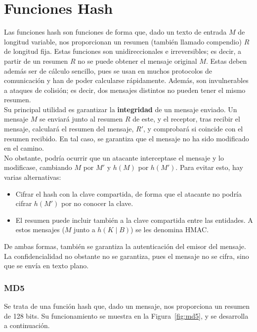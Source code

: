\section{Funciones Hash}

Las funciones hash son funciones de forma que, dado un texto de entrada $M$ de longitud variable, nos proporcionan un resumen (también llamado compendio) $R$ de longitud fija. Estas funciones son unidireccionales e irreversibles; es decir, a partir de un resumen $R$ no se puede obtener el mensaje original $M$. Estas deben además ser de cálculo sencillo, pues se usan en muchos protocolos de comunicación y han de poder calcularse rápidamente. Además, son invulnerables a ataques de colisión; es decir, dos mensajes distintos no pueden tener el mismo resumen.\\



Su principal utilidad es garantizar la \textbf{integridad} de un mensaje enviado. Un mensaje $M$ se enviará junto al resumen $R$ de este, y el receptor, tras recibir el mensaje, calculará el resumen del mensaje, $R'$, y comprobará si coincide con el resumen recibido. En tal caso, se garantiza que el mensaje no ha sido modificado en el camino.\\

No obstante, podría ocurrir que un atacante interceptase el mensaje y lo modificase, cambiando $M$ por $M'$ y $h(M)$ por $h(M')$. Para evitar esto, hay varias alternativas:
\begin{itemize}
    \item Cifrar el hash con la clave compartida, de forma que el atacante no podría cifrar $h(M')$ por no conocer la clave.
    \item El resumen puede incluir también a la clave compartida entre las entidades. A estos mensajes ($M$ junto a $h(K\mid B)$) se les denomina \acrfull{HMAC}.
\end{itemize}
De ambas formas, también se garantiza la autenticación del emisor del mensaje. La confidencialidad no obstante no se garantiza, pues el mensaje no se cifra, sino que se envía en texto plano.

\subsubsection{\acrfull{MD5}}

Se trata de una función hash que, dado un mensaje, nos proporciona un resumen de 128 bits. Su funcionamiento se muestra en la Figura~\ref{fig:md5}, y se desarrolla a continuación.\\

